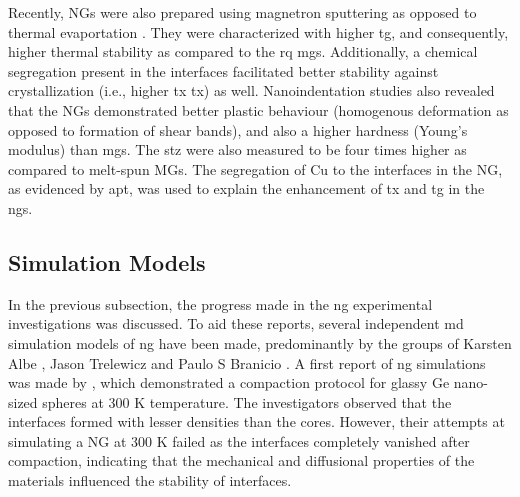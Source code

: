 Recently, \cz NGs were also prepared using magnetron sputtering as opposed to thermal evaportation \cite{Nandam2017,Nandam2018}. They were characterized with higher \gls{tg}, and consequently, higher thermal stability as compared to the \gls{rq} \gls{mg}s. Additionally, a chemical segregation present in the interfaces facilitated better stability against crystallization (i.e., higher \glsdesc{tx} \gls{tx}) as well. Nanoindentation studies also revealed that the NGs demonstrated better plastic behaviour (homogenous deformation as opposed to formation of shear bands), and also a higher hardness (Young's modulus) than \gls{mg}s. The \gls{stz} were also measured to be four times higher as compared to melt-spun MGs. The segregation of Cu to the interfaces in the NG, as evidenced by \gls{apt}, was used to explain the enhancement of \gls{tx} and \gls{tg} in the \gls{ng}s. \par

\subsection{Simulation Models}

In the previous subsection, the progress made in the \gls{ng} experimental investigations was discussed. To aid these reports, several independent \gls{md} simulation models of \gls{ng} have been made, predominantly by the groups of Karsten Albe \cite{Krasnochtchekov2003, Sopu2009, Ritter2011, Adjaoud2016, Adjaoud2018, Adjaoud2019, Adjaoud2020, Kalcher2017}, Jason Trelewicz \cite{Cheng2019,Cheng2019a} and Paulo S Branicio \cite{Adibi2014,Sha2017,Zheng2020,Zheng2021}. A first report of \gls{ng} simulations was made by \textcite{Sopu2009}, which demonstrated a compaction protocol for glassy Ge nano-sized spheres at 300 K temperature. The investigators observed that the interfaces formed with lesser densities than the cores. However, their attempts at simulating a \cz NG at 300 K failed as the interfaces completely vanished after compaction, indicating that the mechanical and diffusional properties of the materials influenced the stability of interfaces. \par

